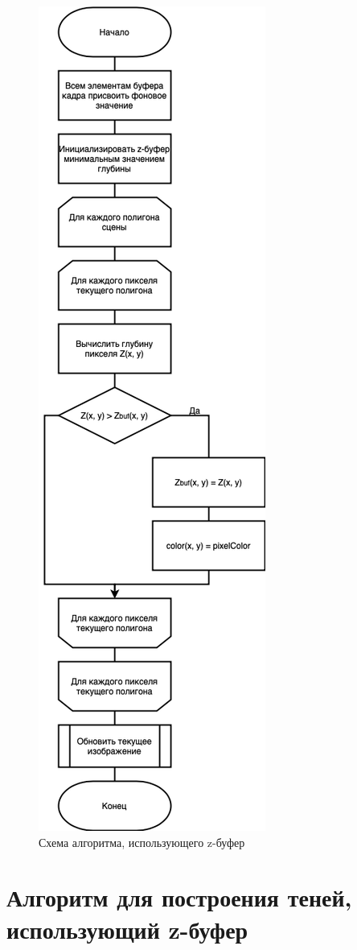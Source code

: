 \clearpage
\begin{figure}[h]
    \centering
    \includegraphics[width=0.4\linewidth]{img/zbuf.png}
    \caption{Схема алгоритма, использующего z-буфер}
    \label{img:zbuf}
\end{figure}
\noindent

\clearpage

\section{Алгоритм для построения теней, использующий z-буфер}

